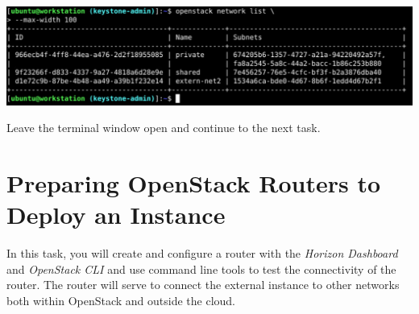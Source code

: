 \documentclass[letterpaper, 12pt]{article}
\begin{document}
\begin{enumerate}
\begin{labstep}
        \begin{center}
            \includegraphics[width=\linewidth]{images/part1/step17.png}
        \end{center}
    \end{labstep}

    \begin{labstep}
        Leave the terminal window open and continue to the next task.
    \end{labstep}

\end{enumerate}

\section{Preparing OpenStack Routers to Deploy an Instance}\label{sec:preparing-openstack-routers-to-deploy-an-instance}
In this task, you will create and configure a router with the \textit{Horizon Dashboard} and \textit{OpenStack CLI} and use command line tools to test the connectivity of the router.
The router will serve to connect the external instance to other networks both within OpenStack and outside the cloud.
\end{document}
